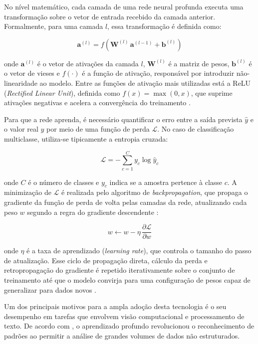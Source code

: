 \documentclass[
    12pt,                %
    openright,           %
    oneside,             %
    a4paper,             %
    english,             %
    brazil               %
]{abntex2}
\begin{document}
No nível matemático, cada camada de uma rede neural profunda executa uma transformação sobre o vetor de entrada recebido da camada anterior. Formalmente, para uma camada $l$, essa transformação é definida como:

\begin{equation}
    \mathbf{a}^{(l)} = f\!\left(\mathbf{W}^{(l)}\,\mathbf{a}^{(l-1)} + \mathbf{b}^{(l)}\right)
    \label{eq:forward}
\end{equation}

\noindent onde $\mathbf{a}^{(l)}$ é o vetor de ativações da camada $l$, $\mathbf{W}^{(l)}$ é a matriz de pesos, $\mathbf{b}^{(l)}$ é o vetor de vieses e $f(\cdot)$ é a função de ativação, responsável por introduzir não-linearidade ao modelo. Entre as funções de ativação mais utilizadas está a ReLU (\textit{Rectified Linear Unit}), definida como $f(x) = \max(0, x)$, que suprime ativações negativas e acelera a convergência do treinamento \cite{Goodfellow2016}.

Para que a rede aprenda, é necessário quantificar o erro entre a saída prevista $\hat{y}$ e o valor real $y$ por meio de uma função de perda $\mathcal{L}$. No caso de classificação multiclasse, utiliza-se tipicamente a entropia cruzada:

\begin{equation}
    \mathcal{L} = -\sum_{c=1}^{C} y_c \log\hat{y}_c
    \label{eq:loss}
\end{equation}

\noindent onde $C$ é o número de classes e $y_c$ indica se a amostra pertence à classe $c$. A minimização de $\mathcal{L}$ é realizada pelo algoritmo de \textit{backpropagation}, que propaga o gradiente da função de perda de volta pelas camadas da rede, atualizando cada peso $w$ segundo a regra do gradiente descendente \cite{Goodfellow2016}:

\begin{equation}
    w \leftarrow w - \eta \,\frac{\partial \mathcal{L}}{\partial w}
    \label{eq:grad}
\end{equation}

\noindent onde $\eta$ é a taxa de aprendizado (\textit{learning rate}), que controla o tamanho do passo de atualização. Esse ciclo de propagação direta, cálculo da perda e retropropagação do gradiente é repetido iterativamente sobre o conjunto de treinamento até que o modelo convirja para uma configuração de pesos capaz de generalizar para dados novos \cite{Goodfellow2016}.

Um dos principais motivos para a ampla adoção desta tecnologia é o seu desempenho em tarefas que envolvem visão computacional e processamento de texto. De acordo com , o aprendizado profundo revolucionou o reconhecimento de padrões ao permitir a análise de grandes volumes de dados não estruturados.
\end{document}
